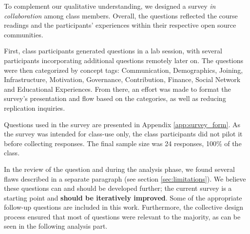 

To complement our qualitative understanding, we designed a survey {\it in collaboration} among class members. Overall, the questions reflected the course readings and the participants' experiences within their respective open source communities. 

First, class participants generated questions in a lab session, with several participants incorporating additional questions remotely later on. The questions were then categorized by concept tags: Communication, Demographics, Joining, Infrastructure, Motivation, Governance, Contribution, Finance, Social Network and Educational Experiences. From there, an effort was made to format the survey's presentation and flow based on the categories, as well as reducing replication inquiries.

Questions used in the survey  are presented in Appendix \ref{app:survey_form}. As the survey was intended for class-use only, the class participants did not pilot it before collecting responses. The final sample size was 24 responses, 100\% of the class.

In the review of the question and during the analysis phase, we found several flaws described in a separate paragraph (see section \ref{sec:limitations}). We believe these questions can and should be developed further; the current survey is a starting point and {\bf should be iteratively improved}. Some of the appropriate follow-up questions are included in this work. Furthermore, the collective design process ensured that most of questions were relevant to the majority, as can be seen in the following analysis part.
